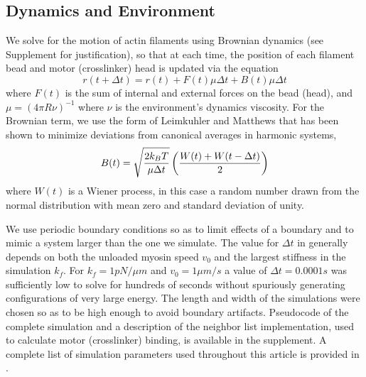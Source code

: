 \documentclass[12pt]{article}
\begin{document}
\subsection{Dynamics and Environment}
We solve for the motion of actin filaments using Brownian dynamics (see 
Supplement for justification), so that at
each time, the position of each filament bead and motor (crosslinker) head is 
updated via the equation
\begin{equation}  
  r(t+\Delta t) = r(t) + F(t)\mu \Delta t + B(t) \mu \Delta t
\label{eqn:overdamped}
\end{equation}
where $F(t)$ is the sum of internal and external forces on the bead (head), 
and $\mu = (4\pi R\nu)^{-1}$ where $\nu$ is the environment's dynamics viscosity. 
For the Brownian term, we use the form of
Leimkuhler and Matthews \cite{leimkuhler2012,leimkuhler2013} that has
been shown to minimize deviations from canonical averages in harmonic systems, 
\begin{equation}
  B(t)=\sqrt{2k_BT\over\mu \Delta t}\left({W(t)+W(t-\Delta t)\over2}\right)
  \label{eqn:baoab_brownian}
\end{equation} 
where $W(t)$ is a Wiener process, in this case a random number drawn from the
normal distribution with mean zero and standard deviation of unity.
\par
We use periodic boundary conditions so as to limit effects of a
boundary and to mimic a system larger than the one we simulate. The value for 
$\Delta t$ in generally depends on both the unloaded myosin 
speed
$v_0$ and the largest stiffness in the simulation $k_f$. For $k_f = 1pN/\mu m$
and $v_0=1\mu m/s$ a value of $\Delta t = 0.0001 s$ was sufficiently low to
solve  for hundreds of seconds without spuriously
generating configurations of very large energy. The length and width of the
simulations were chosen so as to be high enough to avoid boundary artifacts. 
Pseudocode of the complete simulation and a description of the neighbor list 
implementation, used to calculate motor (crosslinker) binding, is available in 
the supplement. A complete list of simulation parameters used throughout this
article is provided in . 
\end{document}
